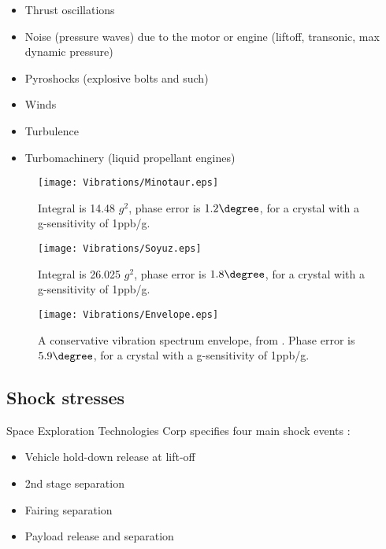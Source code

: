\begin{itemize}
\item{Thrust oscillations\cite{NASAVibrations}}
\item{Noise (pressure waves) due to the motor or
engine (liftoff, transonic, max dynamic pressure)\cite{NASAVibrations}}
\item{Pyroshocks (explosive bolts and such)\cite{HarveyMudd}}
\item{Winds\cite{HarveyMudd}}
\item{Turbulence\cite{HarveyMudd}}
\item{Turbomachinery (liquid propellant engines)\cite{HarveyMudd}}
\end{itemize}

\begin{figure}[!htb] 
    \centering
    \texttt{[image: Vibrations/Minotaur.eps]} 
    \caption{Integral is 14.48 $g^2$, phase error is $1.2\degree$, for a crystal with a g-sensitivity of  1ppb/g.}
    \label{fig:MinotaurVibrations}
\end{figure}


\begin{figure}[!htb] 
    \centering
    \texttt{[image: Vibrations/Soyuz.eps]} 
    \caption{Integral is 26.025 $g^2$, phase error is $1.8\degree$, for a crystal with a g-sensitivity of  1ppb/g.}
    \label{fig:SoyuzVibrations}
\end{figure}

\begin{figure}[!htb] 
    \centering
    \texttt{[image: Vibrations/Envelope.eps]} 
    \caption{A conservative vibration spectrum envelope, from \cite{VibrationHandout}. Phase error is $5.9\degree$, for a crystal with a g-sensitivity of  1ppb/g.}
    \label{fig:ConservativeVibrations}
\end{figure}



\subsection{Shock stresses}
Space Exploration Technologies Corp  specifies four main shock events
\cite{Falcon9}: 
\begin{itemize}
\item{Vehicle hold-down release at lift-off} 
\item{2nd stage separation}
\item{Fairing separation}
\item{Payload release and separation}
\end{itemize}

